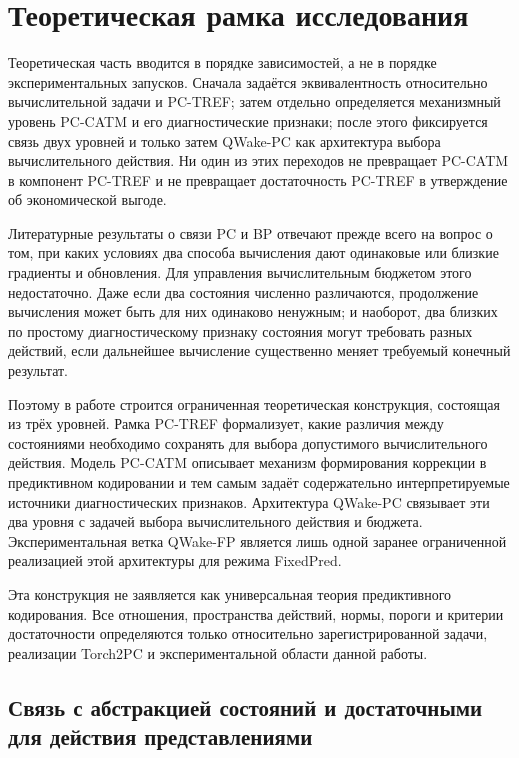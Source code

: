 \section{Теоретическая рамка исследования}
\label{sec:theory-framework}

Теоретическая часть вводится в порядке зависимостей, а не в порядке
экспериментальных запусков. Сначала задаётся эквивалентность относительно
вычислительной задачи и PC-TREF; затем отдельно определяется механизмный уровень
PC-CATM и его диагностические признаки; после этого фиксируется связь двух
уровней и только затем QWake-PC как архитектура выбора вычислительного действия.
Ни один из этих переходов не превращает PC-CATM в компонент PC-TREF и не
превращает достаточность PC-TREF в утверждение об экономической выгоде.

Литературные результаты о связи PC и BP отвечают прежде всего на вопрос о
том, при каких условиях два способа вычисления дают одинаковые или близкие
градиенты и обновления. Для управления вычислительным бюджетом этого
недостаточно. Даже если два состояния численно различаются, продолжение
вычисления может быть для них одинаково ненужным; и наоборот, два близких по
простому диагностическому признаку состояния могут требовать разных действий,
если дальнейшее вычисление существенно меняет требуемый конечный результат.

Поэтому в работе строится ограниченная теоретическая конструкция,
состоящая из трёх уровней. Рамка PC-TREF формализует, какие различия между
состояниями необходимо сохранять для выбора допустимого вычислительного
действия. Модель PC-CATM описывает механизм формирования коррекции в
предиктивном кодировании и тем самым задаёт содержательно интерпретируемые
источники диагностических признаков. Архитектура QWake-PC связывает эти два
уровня с задачей выбора вычислительного действия и бюджета. Экспериментальная
ветка QWake-FP является лишь одной заранее ограниченной реализацией этой
архитектуры для режима FixedPred.

Эта конструкция не заявляется как универсальная теория предиктивного
кодирования. Все отношения, пространства действий, нормы, пороги и критерии
достаточности определяются только относительно зарегистрированной задачи,
реализации Torch2PC и экспериментальной области данной работы.

\subsection{Связь с абстракцией состояний и достаточными для действия представлениями}
\label{sec:theory-state-abstraction-basis}

